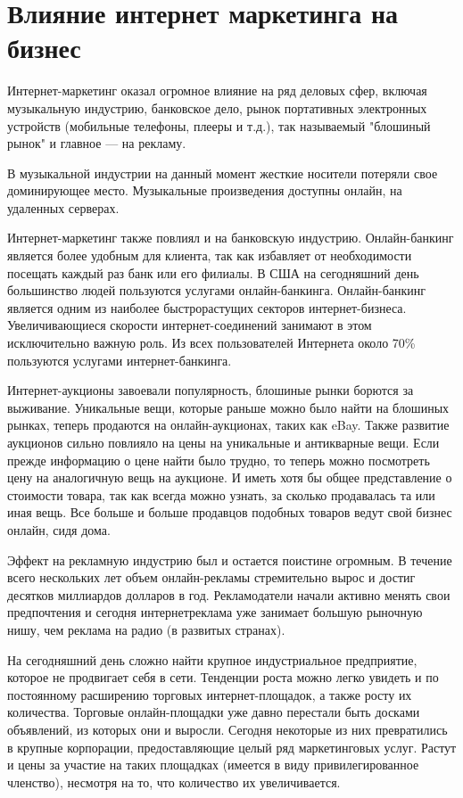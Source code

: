 \documentclass[a4paper,english,russian]{G2-105}
\begin{document}
\section{Влияние интернет маркетинга на бизнес}
\par Интернет-маркетинг оказал огромное влияние на ряд деловых сфер, включая музыкальную индустрию, банковское дело, рынок портативных электронных устройств (мобильные телефоны, плееры и т.д.), так называемый "блошиный рынок" и главное --- на рекламу.
\par В музыкальной индустрии на данный момент жесткие носители потеряли свое доминирующее место. Музыкальные произведения доступны онлайн, на удаленных серверах.
\par Интернет-маркетинг также повлиял и на банковскую индустрию. Онлайн-банкинг является более удобным для клиента, так как избавляет от необходимости посещать каждый раз банк или его филиалы. В США на сегодняшний день большинство людей пользуются услугами онлайн-банкинга. Онлайн-банкинг является одним из наиболее быстрорастущих секторов интернет-бизнеса. Увеличивающиеся скорости интернет-соединений занимают в этом исключительно важную роль. Из всех пользователей Интернета около 70\% пользуются услугами интернет-банкинга.
\par Интернет-аукционы завоевали популярность, блошиные рынки борются за выживание. Уникальные вещи, которые раньше можно было найти на блошиных рынках, теперь продаются на онлайн-аукционах, таких как eBay. Также развитие аукционов сильно повлияло на цены на уникальные и антикварные вещи. Если прежде информацию о цене найти было трудно, то теперь можно посмотреть цену на аналогичную вещь на аукционе. И иметь хотя бы общее представление о стоимости товара, так как всегда можно узнать, за сколько продавалась та или иная вещь. Все больше и больше продавцов подобных товаров ведут свой бизнес онлайн, сидя дома.
\par Эффект на рекламную индустрию был и остается поистине огромным. В течение всего нескольких лет объем онлайн-рекламы стремительно вырос и достиг десятков миллиардов долларов в год. Рекламодатели начали активно менять свои предпочтения и сегодня интернетреклама уже занимает большую рыночную нишу, чем реклама на радио (в развитых странах).
\par На сегодняшний день сложно найти крупное индустриальное предприятие, которое не продвигает себя в сети. Тенденции роста можно легко увидеть и по постоянному расширению торговых интернет-площадок, а также росту их количества. Торговые онлайн-площадки уже давно перестали быть досками объявлений, из которых они и выросли. Сегодня некоторые из них превратились в крупные корпорации, предоставляющие целый ряд маркетинговых услуг. Растут и цены за участие на таких площадках (имеется в виду привилегированное членство), несмотря на то, что количество их увеличивается.
\end{document}
